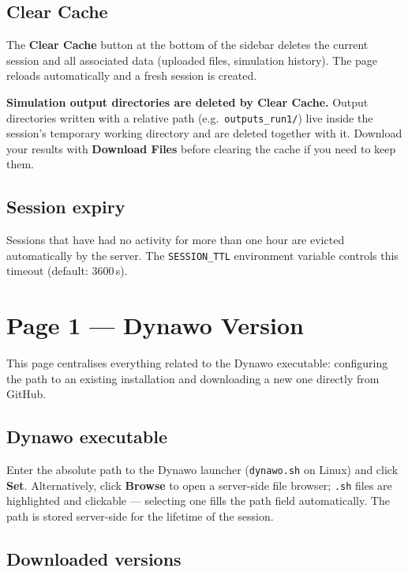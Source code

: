 \documentclass[a4paper,11pt]{article}
\newcommand{\code}[1]{\texttt{\small #1}}
\begin{document}
\subsection{Clear Cache}

The \textbf{Clear Cache} button at the bottom of the sidebar deletes the
current session and all associated data (uploaded files, simulation history).
The page reloads automatically and a fresh session is created.

\begin{notebox}
\textbf{Simulation output directories are deleted by Clear Cache.}
Output directories written with a relative path (e.g.\ \code{outputs\_run1/})
live inside the session's temporary working directory and are deleted together
with it. Download your results with \textbf{Download Files} before clearing
the cache if you need to keep them.
\end{notebox}

\subsection{Session expiry}

Sessions that have had no activity for more than one hour are evicted
automatically by the server. The \code{SESSION\_TTL} environment variable
controls this timeout (default: 3600\,s).

\section{Page 1 --- Dynawo Version}
\label{sec:dynawoversion}

This page centralises everything related to the Dynawo executable: configuring
the path to an existing installation and downloading a new one directly from
GitHub.

\subsection{Dynawo executable}

Enter the absolute path to the Dynawo launcher (\code{dynawo.sh} on Linux) and
click \textbf{Set}. Alternatively, click \textbf{Browse} to open a server-side
file browser; \code{.sh} files are highlighted and clickable --- selecting one
fills the path field automatically. The path is stored server-side for the
lifetime of the session.

\subsection{Downloaded versions}
\end{document}
